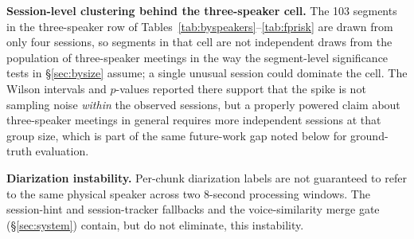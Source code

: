 \documentclass[conference,a4paper]{IEEEtran}
\begin{document}
\textbf{Session-level clustering behind the three-speaker cell.} The
103 segments in the three-speaker row of
Tables~\ref{tab:byspeakers}--\ref{tab:fprisk} are drawn from only four
sessions, so segments in that cell are not independent draws from the
population of three-speaker meetings in the way the segment-level
significance tests in \S\ref{sec:bysize} assume; a single unusual
session could dominate the cell. The Wilson intervals and $p$-values
reported there support that the spike is not sampling noise
\emph{within} the observed sessions, but a properly powered claim about
three-speaker meetings in general requires more independent sessions
at that group size, which is part of the same future-work gap noted
below for ground-truth evaluation.

\textbf{Diarization instability.} Per-chunk diarization labels are not
guaranteed to refer to the same physical speaker across two 8-second
processing windows. The session-hint and session-tracker fallbacks and
the voice-similarity merge gate (\S\ref{sec:system}) contain, but do
not eliminate, this instability.
\end{document}

